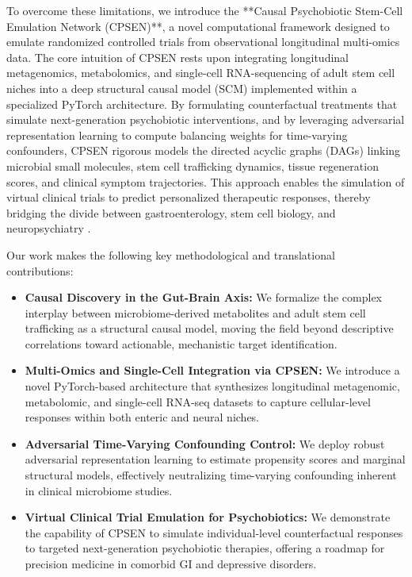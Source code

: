 \documentclass[10pt,twocolumn]{article}
\begin{document}
To overcome these limitations, we introduce the **Causal Psychobiotic Stem-Cell Emulation Network (CPSEN)**, a novel computational framework designed to emulate randomized controlled trials from observational longitudinal multi-omics data. The core intuition of CPSEN rests upon integrating longitudinal metagenomics, metabolomics, and single-cell RNA-sequencing of adult stem cell niches into a deep structural causal model (SCM) implemented within a specialized PyTorch architecture. By formulating counterfactual treatments that simulate next-generation psychobiotic interventions, and by leveraging adversarial representation learning to compute balancing weights for time-varying confounders, CPSEN rigorous models the directed acyclic graphs (DAGs) linking microbial small molecules, stem cell trafficking dynamics, tissue regeneration scores, and clinical symptom trajectories. This approach enables the simulation of virtual clinical trials to predict personalized therapeutic responses, thereby bridging the divide between gastroenterology, stem cell biology, and neuropsychiatry \cite{ref_1, ref_4}.

Our work makes the following key methodological and translational contributions:
\begin{itemize}
    \item \textbf{Causal Discovery in the Gut-Brain Axis:} We formalize the complex interplay between microbiome-derived metabolites and adult stem cell trafficking as a structural causal model, moving the field beyond descriptive correlations toward actionable, mechanistic target identification.
    \item \textbf{Multi-Omics and Single-Cell Integration via CPSEN:} We introduce a novel PyTorch-based architecture that synthesizes longitudinal metagenomic, metabolomic, and single-cell RNA-seq datasets to capture cellular-level responses within both enteric and neural niches.
    \item \textbf{Adversarial Time-Varying Confounding Control:} We deploy robust adversarial representation learning to estimate propensity scores and marginal structural models, effectively neutralizing time-varying confounding inherent in clinical microbiome studies.
    \item \textbf{Virtual Clinical Trial Emulation for Psychobiotics:} We demonstrate the capability of CPSEN to simulate individual-level counterfactual responses to targeted next-generation psychobiotic therapies, offering a roadmap for precision medicine in comorbid GI and depressive disorders.
\end{itemize}
\end{document}
